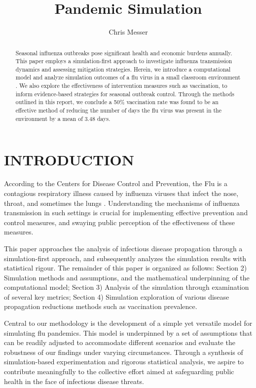 \documentclass[
	letterpaper, %
]{jdf}
\author{Chris Messer}
\title{Pandemic Simulation}
\begin{document}

\maketitle

\begin{abstract}
Seasonal influenza outbreaks pose significant health and economic burdens annually. This paper employs a simulation-first approach to investigate influenza transmission dynamics and assessing mitigation strategies.  Herein, we introduce a computational model and analyze simulation outcomes of a flu virus in a small classroom environment . We also explore the effectiveness of intervention measures such as vaccination, to inform evidence-based strategies for seasonal outbreak control. Through the methods outlined in this report, we conclude a 50\% vaccination rate was found to be an effective method of reducing the number of days the flu virus was present in the environment by a mean of 3.48 days. 
\end{abstract}

\section{INTRODUCTION}
According to the Centers for Disease Control and Prevention, the Flu is a contagious respiratory illness caused by influenza viruses that infect the nose, throat, and sometimes the lungs \citep{cdc}. Understanding the mechanisms of influenza transmission in such settings is crucial for implementing effective prevention and control measures, and swaying public perception of the effectiveness of these measures.

This paper approaches the analysis of infectious disease propagation through a simulation-first approach, and subsequently analyzes the simulation results with statistical rigour. The remainder of this paper is organized as follows: Section 2) Simulation methods and assumptions, and the mathematical underpinning of the computational model; Section 3) Analysis of the simulation through examination of several key metrics; Section 4) Simulation exploration of various disease propagation reductions methods such as vaccination prevalence. 

Central to our methodology is the development of a simple yet versatile model for simulating flu pandemics. This model is underpinned by a set of assumptions that can be readily adjusted to accommodate different scenarios and evaluate the robustness of our findings under varying circumstances. Through a synthesis of simulation-based experimentation and rigorous statistical analysis, we aspire to contribute meaningfully to the collective effort aimed at safeguarding public health in the face of infectious disease threats.
\end{document}
